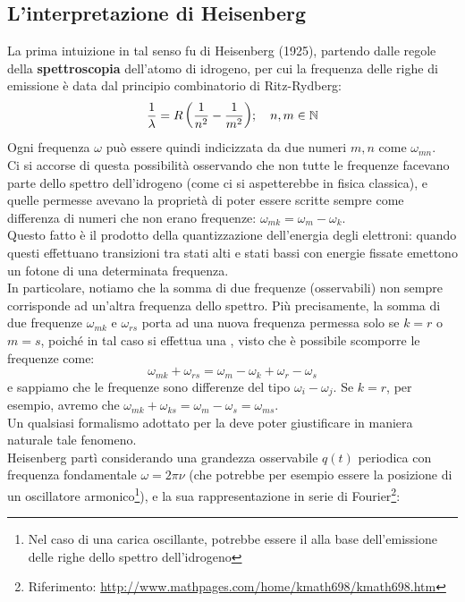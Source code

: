 \documentclass[FisicaTeorica.tex]{subfiles}
\begin{document}
\subsection{L'interpretazione di Heisenberg}
La prima intuizione in tal senso fu di Heisenberg (1925), partendo dalle regole della \textbf{spettroscopia} dell'atomo di idrogeno, per cui la frequenza delle righe di emissione è data dal principio combinatorio di Ritz-Rydberg:
\[
{\displaystyle {\frac {1}{\lambda }}=R\left({\frac {1}{n^{2}}}-{\frac {1}{m^{2}}}\right)}; \quad n,m \in \mathbb{N}
\]
Ogni frequenza $\omega$ può essere quindi indicizzata da due numeri $m,n$ come $\omega_{mn}$.\\
Ci si accorse di questa possibilità osservando che non tutte le frequenze facevano parte dello spettro dell'idrogeno (come ci si aspetterebbe in fisica classica), e quelle permesse avevano la proprietà di poter essere scritte sempre come differenza di numeri che non erano frequenze: $\omega_{mk} = \omega_m - \omega_k$.\\
Questo fatto è il prodotto della quantizzazione dell'energia degli elettroni: quando questi effettuano transizioni tra stati alti e stati bassi con energie fissate emettono un fotone di una determinata frequenza.\\
In particolare, notiamo che la somma di due frequenze (osservabili) non sempre corrisponde ad un'altra frequenza dello spettro. Più precisamente, la somma di due frequenze $\omega_{mk}$ e $\omega_{rs}$ porta ad una nuova frequenza permessa solo se $k=r$ o $m=s$, poiché in tal caso si effettua una , visto che è possibile scomporre le frequenze come:
\[
\omega_{mk} + \omega_{rs} = \omega_m - \omega_k + \omega_r -\omega_s
\]
e sappiamo che le frequenze  sono differenze del tipo $\omega_i - \omega_j$. Se $k = r$, per esempio, avremo che $\omega_{mk} + \omega_{ks} = \omega_m - \omega_s = \omega_{ms}$.\\
Un qualsiasi formalismo adottato per la \MQ deve poter giustificare in maniera naturale tale fenomeno.\\
Heisenberg partì considerando una grandezza osservabile $q(t)$ periodica con frequenza fondamentale $\omega = 2\pi\nu$ (che potrebbe per esempio essere la posizione di un oscillatore armonico\footnote{Nel caso di una carica oscillante, potrebbe essere il  alla base dell'emissione delle righe dello spettro dell'idrogeno}), e la sua rappresentazione in serie di Fourier\footnote{Riferimento: \href{http://www.mathpages.com/home/kmath698/kmath698.htm}{http://www.mathpages.com/home/kmath698/kmath698.htm}}:
\end{document}

